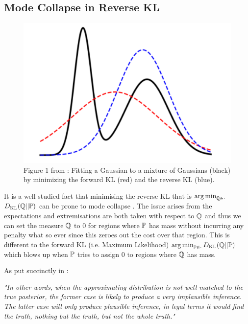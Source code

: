 \documentclass[a4paper,12pt,twoside,openright]{report}
\theoremstyle{definition}
\begin{document}
\subsection{Mode Collapse in Reverse KL}

\begin{figure}
    \centering
    \includegraphics[scale=0.5]{images/zhang_et_al.PNG}
    \caption{Figure 1 from \cite{zhang2019variational}:  Fitting a Gaussian to a mixture of Gaussians (black) by
minimizing the forward KL (red) and the reverse KL (blue).}
    \label{fig:babrber_kl}
\end{figure}

It is a well studied fact that minimising the reverse KL that is $\argmin_{\Q \in \cdot }$ $\KL(\Q ||\P)$ can be prone to mode collapse \citep{zhang2019variational}. The issue arises from the expectations and extremisations are both taken with respect to $\Q$ and thus we can set the measure $\Q$ to 0 for regions where $\P$ has mass without incurring any penalty what so ever since this zeroes out the cost over that region. This is different to the forward KL (i.e. Maximum Likelihood)  $\argmin_{\P \in \cdot }\KL(\Q ||\P)$  which blows up  when $\P$ tries to assign $0$ to regions where $\Q$ has mass.

As put succinctly in \cite{lawrence2001variational}:

\textit{"In other words, when the approximating distribution is not
well matched to the true posterior, the former case is likely to produce a very implausible inference.
The latter case will only produce plausible inference, in legal terms it would find the truth, nothing
but the truth, but not the whole truth."}
\end{document}

